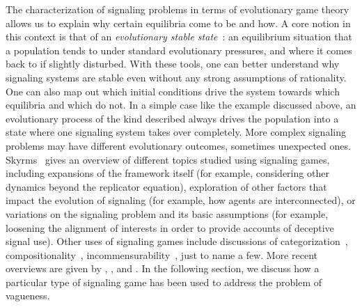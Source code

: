 \documentclass[a4paper]{article}
\begin{document}
The characterization of signaling problems in terms of evolutionary game theory allows us to explain why certain equilibria come to be and how.
A core notion in this context is that of an \emph{evolutionary stable state}~\parencite{maynard_smith_evolution_1982}: an equilibrium situation that a population tends to under standard evolutionary pressures, and where it comes back to if slightly disturbed.
With these tools, one can better understand why signaling systems are stable even without any strong assumptions of rationality.
One can also map out which initial conditions drive the system towards which equilibria and which do not.
In a simple case like the example discussed above, an evolutionary process of the kind described always drives the population into a state where one signaling system takes over completely. %
More complex signaling problems may have different evolutionary outcomes, sometimes unexpected ones.
Skyrms~\parencite*{skyrms_signals_2010} gives an overview of different topics studied using signaling games, including expansions of the framework itself (for example, considering other dynamics beyond the replicator equation), exploration of other factors that impact the evolution of signaling (for example, how agents are interconnected), or variations on the signaling problem and its basic assumptions (for example, loosening the alignment of interests in order to provide accounts of deceptive signal use).
Other uses of signaling games include discussions of categorization~\parencite[\emph{e.g.}][]{jager_language_2007}, compositionality~\parencite[\emph{e.g.}][]{barrett_evolution_2009}, incommensurability~\parencite[\emph{e.g.}][]{barrett_faithful_2010}, just to name a few.
More recent overviews are given by \textcites{huttegger_how_2014}, \textcite{huttegger_dynamics_2014}, and \textcite{FrankeWagner2014:Game-Theory-and}.
In the following section, we discuss how a particular type of signaling game has been used to address the problem of vagueness.

%
\end{document}

